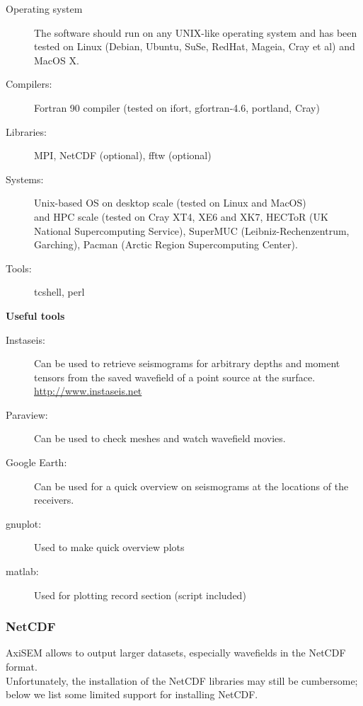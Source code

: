 \documentclass{article}
\begin{document}
\begin{description}
    \item[Operating system] The software should run on any UNIX-like operating system and has
          been tested on Linux (Debian, Ubuntu, SuSe, RedHat, Mageia, Cray et al) and MacOS X.
    \item[Compilers:] Fortran 90 compiler (tested on ifort, gfortran-4.6, portland, Cray)
    \item[Libraries:] MPI, NetCDF (optional), fftw (optional)
    \item[Systems:] Unix-based OS on desktop scale (tested on Linux and MacOS)\\ and HPC scale (tested on Cray XT4, XE6 and XK7, HECToR (UK National Supercomputing Service), SuperMUC (Leibniz-Rechenzentrum, Garching), Pacman (Arctic Region Supercomputing Center).
    \item[Tools:] tcshell, perl
\end{description}\vspace*{0.3cm}

\textbf{Useful tools}

\begin{description}
    \item[Instaseis:] Can be used to retrieve seismograms for arbitrary depths and moment tensors from
    the saved wavefield of a point source at the surface. \url{http://www.instaseis.net}
    \item[Paraview:] Can be used to check meshes and watch wavefield movies.
    \item[Google Earth:] Can be used for a quick overview on seismograms at the locations
          of the receivers.
    \item[gnuplot:] Used to make quick overview plots
    \item[matlab:] Used for plotting record section (script included)
\end{description}


\subsubsection{NetCDF}
\label{sssec:netcdf}

AxiSEM allows to output larger datasets, especially wavefields in the NetCDF format. \\
Unfortunately, the installation of the NetCDF libraries may still be cumbersome; below we
list some limited support for installing NetCDF.
\end{document}
